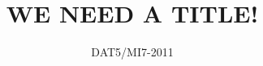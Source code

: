 \documentclass[twoside]{report}
\begin{document}
\title{WE NEED A TITLE!}
\author{DAT5/MI7-2011}
\maketitle

\tableofcontents




\end{document}
